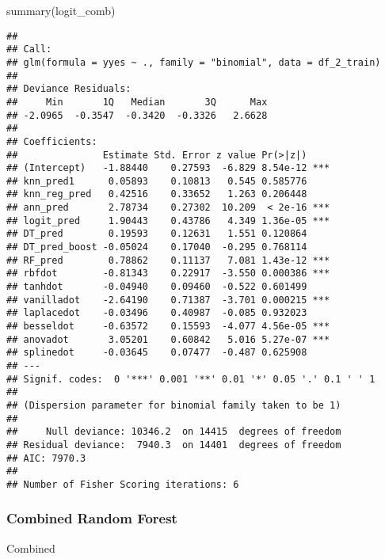 \documentclass[
]{article}
\newenvironment{Shaded}{\begin{snugshade}}{\end{snugshade}}
\newcommand{\AttributeTok}[1]{\textcolor[rgb]{0.77,0.63,0.00}{#1}}
\newcommand{\DecValTok}[1]{\textcolor[rgb]{0.00,0.00,0.81}{#1}}
\newcommand{\FunctionTok}[1]{\textcolor[rgb]{0.00,0.00,0.00}{#1}}
\newcommand{\NormalTok}[1]{#1}
\newcommand{\OtherTok}[1]{\textcolor[rgb]{0.56,0.35,0.01}{#1}}
\newcommand{\SpecialCharTok}[1]{\textcolor[rgb]{0.00,0.00,0.00}{#1}}
\begin{document}
\begin{Shaded}
\begin{Highlighting}[]
\FunctionTok{summary}\NormalTok{(logit\_comb)}
\end{Highlighting}
\end{Shaded}

\begin{verbatim}
## 
## Call:
## glm(formula = yyes ~ ., family = "binomial", data = df_2_train)
## 
## Deviance Residuals: 
##     Min       1Q   Median       3Q      Max  
## -2.0965  -0.3547  -0.3420  -0.3326   2.6628  
## 
## Coefficients:
##               Estimate Std. Error z value Pr(>|z|)    
## (Intercept)   -1.88440    0.27593  -6.829 8.54e-12 ***
## knn_pred1      0.05893    0.10813   0.545 0.585776    
## knn_reg_pred   0.42516    0.33652   1.263 0.206448    
## ann_pred       2.78734    0.27302  10.209  < 2e-16 ***
## logit_pred     1.90443    0.43786   4.349 1.36e-05 ***
## DT_pred        0.19593    0.12631   1.551 0.120864    
## DT_pred_boost -0.05024    0.17040  -0.295 0.768114    
## RF_pred        0.78862    0.11137   7.081 1.43e-12 ***
## rbfdot        -0.81343    0.22917  -3.550 0.000386 ***
## tanhdot       -0.04940    0.09460  -0.522 0.601499    
## vanilladot    -2.64190    0.71387  -3.701 0.000215 ***
## laplacedot    -0.03496    0.40987  -0.085 0.932023    
## besseldot     -0.63572    0.15593  -4.077 4.56e-05 ***
## anovadot       3.05201    0.60842   5.016 5.27e-07 ***
## splinedot     -0.03645    0.07477  -0.487 0.625908    
## ---
## Signif. codes:  0 '***' 0.001 '**' 0.01 '*' 0.05 '.' 0.1 ' ' 1
## 
## (Dispersion parameter for binomial family taken to be 1)
## 
##     Null deviance: 10346.2  on 14415  degrees of freedom
## Residual deviance:  7940.3  on 14401  degrees of freedom
## AIC: 7970.3
## 
## Number of Fisher Scoring iterations: 6
\end{verbatim}

\hypertarget{combined-random-forest}{%
\subsubsection{Combined Random Forest}\label{combined-random-forest}}

Combined

\begin{Shaded}
\end{Shaded}
\end{document}
